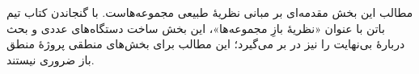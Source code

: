 \documentclass[../../include/open-logic-part]{subfiles}
\begin{document}

\begin{editorial}
  مطالب این بخش مقدمه‌ای بر مبانی نظریهٔ طبیعی مجموعه‌هاست. با
  گنجاندن کتاب تیم باتن با عنوان «نظریهٔ بازِ مجموعه‌ها»، این
  بخش ساخت دستگاه‌های عددی و بحث دربارهٔ بی‌نهایت را نیز در بر
  می‌گیرد؛ این مطالب برای بخش‌های منطقی پروژهٔ منطق باز ضروری
  نیستند.
\end{editorial}







\OLEndPartHook
\end{document}
